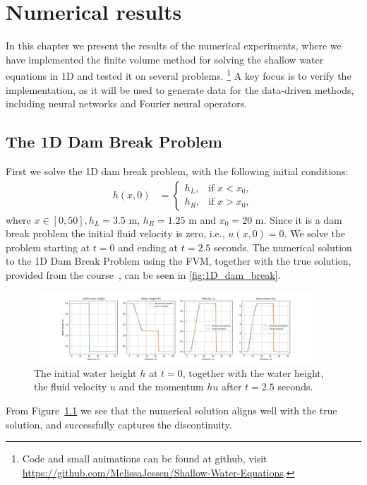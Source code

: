 \chapter{Numerical results}
In this chapter we present the results of the numerical experiments, where we have implemented the finite volume method for solving the shallow water equations in 1D and tested it on several problems.
\footnote{Code and small animations can be found at github, visit \url{https://github.com/MelissaJessen/Shallow-Water-Equations}.}
A key focus is to verify the implementation, as it will be used to generate data for the data-driven methods, including neural networks and Fourier neural operators.

\section{The 1D Dam Break Problem}
First we solve the 1D dam break problem, with the following initial conditions:
\begin{align*}
    h(x,0) &= \begin{cases}
        h_L, & \text{if } x < x_0, \\
        h_R, & \text{if } x > x_0,
    \end{cases} 
\end{align*}
where $x \in [0, 50], h_L = 3.5$ m, $h_R = 1.25$ m and $x_0 = 20$ m.
Since it is a dam break problem the initial fluid velocity is zero, i.e., $u(x,0) = 0$.
We solve the problem starting at $t=0$ and ending at $t=2.5$ seconds.
The numerical solution to the 1D Dam Break Problem using the FVM, together with the true solution, provided from the course~\cite{phd_corse_2009}, can be seen in \autoref{fig:1D_dam_break}.
\begin{figure}[H]
    \centering
    \includegraphics[width=0.95\textwidth]{plots/sol_1D_val.png}
    \caption{The initial water height $h$ at $t=0$, together with the water height, the fluid velocity $u$ and the momentum $hu$ after $t=2.5$ seconds.}\label{fig:1D_dam_break}
\end{figure}
From Figure~\ref{fig:1D_dam_break} we see that the numerical solution aligns well with the true solution, and successfully captures the discontinuity.


